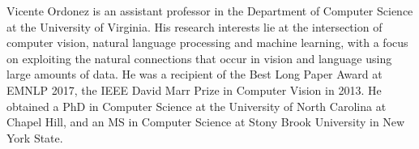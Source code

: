 \documentclass[journal]{IEEEtran}
\begin{document}
\begin{IEEEbiography}{Vicente Ordonez} is an assistant professor in the Department of Computer Science at the University of Virginia. His research interests lie at the intersection of computer vision, natural language processing and machine learning, with a focus on exploiting the natural connections that occur in vision and language using large amounts of data. He was a recipient of the Best Long Paper Award at EMNLP 2017, the IEEE David Marr Prize in Computer Vision in 2013. He obtained a PhD in Computer Science at the University of North Carolina at Chapel Hill, and an MS in Computer Science at Stony Brook University in New York State.
\end{IEEEbiography}






\end{document}
